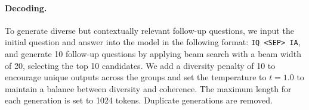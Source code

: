 \paragraph{Decoding.} To generate diverse but contextually relevant follow-up questions, we input the initial question and answer into the model in the following format: \texttt{IQ <SEP> IA}, and generate 10 follow-up questions by applying beam search with a beam width of 20, selecting the top 10 candidates. We add a diversity penalty of 10 to encourage unique outputs across the groups and set the temperature to $t =1.0$ to maintain a balance between diversity and coherence. The maximum length for each generation is set to 1024 tokens. Duplicate generations are removed. %


